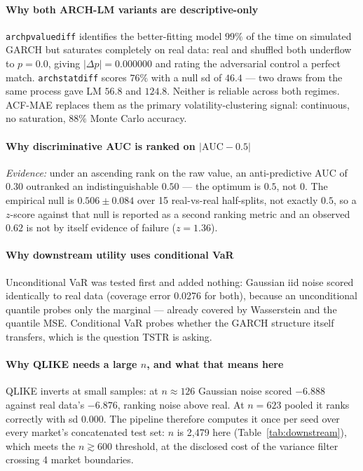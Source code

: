 \documentclass[11pt,a4paper]{article}
\makeatletter
\DeclareRobustCommand{\_}{\ifmmode\nfss@text{\textunderscore}\else\textunderscore\allowbreak\fi}
\makeatother
\begin{document}
\paragraph{Why both ARCH-LM variants are descriptive-only} \texttt{arch\_pvalue\_diff} identifies the better-fitting model $99\%$ of the time on simulated GARCH but saturates completely on real data: real and shuffled both underflow to $p=0.0$, giving $|\Delta p|=0.000000$ and rating the adversarial control a perfect match. \texttt{arch\_stat\_diff} scores $76\%$ with a null sd of $46.4$ --- two draws from the same process gave LM $56.8$ and $124.8$. Neither is reliable across both regimes. ACF-MAE replaces them as the primary volatility-clustering signal: continuous, no saturation, $88\%$ Monte Carlo accuracy.

\paragraph{Why discriminative AUC is ranked on $|\text{AUC}-0.5|$} \textit{Evidence:} under an ascending rank on the raw value, an anti-predictive AUC of $0.30$ outranked an indistinguishable $0.50$ --- the optimum is $0.5$, not $0$. The empirical null is $0.506\pm0.084$ over 15 real-vs-real half-splits, not exactly $0.5$, so a $z$-score against that null is reported as a second ranking metric and an observed $0.62$ is not by itself evidence of failure ($z=1.36$).

\paragraph{Why downstream utility uses conditional VaR} Unconditional VaR was tested first and added nothing: Gaussian iid noise scored identically to real data (coverage error 0.0276 for both), because an unconditional quantile probes only the marginal --- already covered by Wasserstein and the quantile MSE. Conditional VaR probes whether the GARCH structure itself transfers, which is the question TSTR is asking.

\paragraph{Why QLIKE needs a large $n$, and what that means here} QLIKE inverts at small samples: at $n\approx126$ Gaussian noise scored $-6.888$ against real data's $-6.876$, ranking noise above real. At $n=623$ pooled it ranks correctly with sd $0.000$. The pipeline therefore computes it once per seed over every market's concatenated test set: $n$ is 2,479 here (Table~\ref{tab:downstream}), which meets the $n\gtrsim600$ threshold, at the disclosed cost of the variance filter crossing 4 market boundaries.
\end{document}
